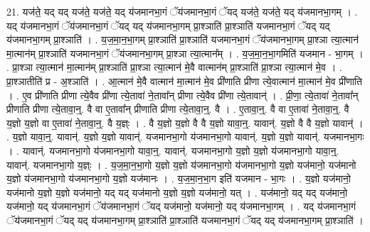 \documentclass[17pt]{extarticle}
\begin{document}
21. यज॑ते॒ यद् यद् यज॑ते॒ यज॑ते॒ यद् य॑जमानभा॒गं ॅय॑जमानभा॒गं ॅयद् यज॑ते॒ यज॑ते॒ यद् य॑जमानभा॒गम् । . यद् य॑जमानभा॒गं ॅय॑जमानभा॒गं ॅयद् यद् य॑जमानभा॒गम् प्रा॒श्ञाति॑ प्रा॒श्ञाति॑ यजमानभा॒गं ॅयद् यद् य॑जमानभा॒गम् प्रा॒श्ञाति॑ । . य॒ज॒मा॒न॒भा॒गम् प्रा॒श्ञाति॑ प्रा॒श्ञाति॑ यजमानभा॒गं ॅय॑जमानभा॒गम् प्रा॒श्ञा त्या॒त्मान॑ मा॒त्मान॑म् प्रा॒श्ञाति॑ यजमानभा॒गं ॅय॑जमानभा॒गम् प्रा॒श्ञा त्या॒त्मान᳚म् । . य॒ज॒मा॒न॒भा॒गमिति॑ यजमान - भा॒गम् । . प्रा॒श्ञा त्या॒त्मान॑ मा॒त्मान॑म् प्रा॒श्ञाति॑ प्रा॒श्ञा त्या॒त्मान॑ मे॒वै वात्मान॑म् प्रा॒श्ञाति॑ प्रा॒श्ञा त्या॒त्मान॑ मे॒व । . प्रा॒श्ञातीति॑ प्र - अ॒श्ञाति॑ । . आ॒त्मान॑ मे॒वै वात्मान॑ मा॒त्मान॑ मे॒व प्री॑णाति प्रीणा त्ये॒वात्मान॑ मा॒त्मान॑ मे॒व प्री॑णाति । . ए॒व प्री॑णाति प्रीणा त्ये॒वैव प्री॑णा त्ये॒तावा॑ ने॒तावा᳚न् प्रीणा त्ये॒वैव प्री॑णा त्ये॒तावान्॑ । . प्री॒णा॒ त्ये॒तावा॑ ने॒तावा᳚न् प्रीणाति प्रीणा त्ये॒तावा॒न्॒. वै वा ए॒तावा᳚न् प्रीणाति प्रीणा त्ये॒तावा॒न्॒. वै । . ए॒तावा॒न्॒. वै वा ए॒तावा॑ ने॒तावा॒न्॒. वै य॒ज्ञो य॒ज्ञो वा ए॒तावा॑ ने॒तावा॒न्॒. वै य॒ज्ञ्ः । . वै य॒ज्ञो य॒ज्ञो वै वै य॒ज्ञो यावा॒न्॒. यावान्॑. य॒ज्ञो वै वै य॒ज्ञो यावान्॑ । . य॒ज्ञो यावा॒न्॒. यावान्॑. य॒ज्ञो य॒ज्ञो यावान्॑. यजमानभा॒गो य॑जमानभा॒गो यावान्॑. य॒ज्ञो य॒ज्ञो यावान्॑. यजमानभा॒गः । . यावान्॑. यजमानभा॒गो य॑जमानभा॒गो यावा॒न्॒. यावान्॑. यजमानभा॒गो य॒ज्ञो य॒ज्ञो य॑जमानभा॒गो यावा॒न्॒. 
यावान्॑. यजमानभा॒गो य॒ज्ञ्ः । . य॒ज॒मा॒न॒भा॒गो य॒ज्ञो य॒ज्ञो य॑जमानभा॒गो य॑जमानभा॒गो य॒ज्ञो यज॑मानो॒ यज॑मानो य॒ज्ञो य॑जमानभा॒गो य॑जमानभा॒गो य॒ज्ञो यज॑मानः । . य॒ज॒मा॒न॒भा॒ग इति॑ यजमान - भा॒गः । . य॒ज्ञो यज॑मानो॒ यज॑मानो य॒ज्ञो य॒ज्ञो यज॑मानो॒ यद् यद् यज॑मानो य॒ज्ञो य॒ज्ञो यज॑मानो॒ यत् । . यज॑मानो॒ यद् यद् यज॑मानो॒ यज॑मानो॒ यद् य॑जमानभा॒गं ॅय॑जमानभा॒गं ॅयद् यज॑मानो॒ यज॑मानो॒ यद् य॑जमानभा॒गम् । . यद् य॑जमानभा॒गं ॅय॑जमानभा॒गं ॅयद् यद् य॑जमानभा॒गम् प्रा॒श्ञाति॑ प्रा॒श्ञाति॑ यजमानभा॒गं ॅयद् यद् य॑जमानभा॒गम् प्रा॒श्ञाति॑ । \newline
\end{document}
